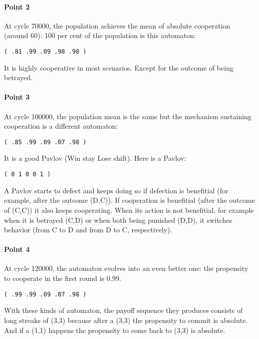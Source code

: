 \documentclass[12.5pt]{report}
\begin{document}
\paragraph{Point 2}

At cycle 70000, the population achieves the mean of absolute cooperation (around 60). 100 per cent of the population is this automaton:
\begin{verbatim}
( .81 .99 .09 .98 .98 )
\end{verbatim}

It is highly cooperative in most scenarios. Except for the outcome of being betrayed.

\paragraph{Point 3}

At cycle 100000, the population mean is the same but the mechanism sustaining cooperation is a different automaton:

\begin{verbatim}
( .85 .99 .09 .07 .98 )
\end{verbatim}

It is a good Pavlov (Win stay Lose shift). Here is a Pavlov:

\begin{verbatim}
( 0 1 0 0 1 )
\end{verbatim}

A Pavlov starts to defect and keeps doing so if defection is benefitial (for example, after the outcome (D,C)). If cooperation is benefitial (after the outcome of (C,C)) it also keeps cooperating. When its action is not benefitial, for example when it is betrayed (C,D) or when both being punished (D,D), it switches behavior (from C to D and from D to C, respectively).

\paragraph{Point 4}

At cycle 120000, the automaton evolves into an even better one: the propensity to cooperate in the first round is 0.99.

\begin{verbatim}
( .99 .99 .09 .07 .98 )
\end{verbatim}
With these kinds of automaton, the payoff sequence they produces consists of long streaks of (3,3) because after a (3,3) the propensity to commit is absolute. And if a (1,1) happens the propensity to come back to (3,3) is absolute.
\end{document}
